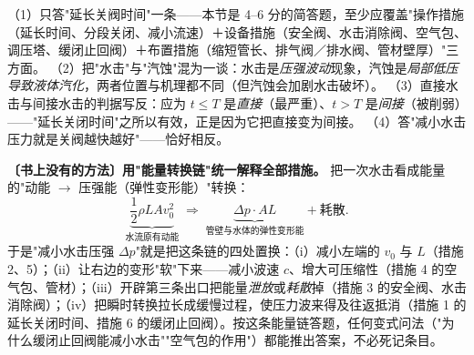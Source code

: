 \begin{yicuo}
（1）只答"延长关阀时间"一条——本节是 4--6 分的简答题，至少应覆盖"操作措施（延长时间、分段关闭、减小流速）＋设备措施（安全阀、水击消除阀、空气包、调压塔、缓闭止回阀）＋布置措施（缩短管长、排气阀／排水阀、管材壁厚）"三方面。
（2）把"水击"与"汽蚀"混为一谈：水击是\emph{压强波动}现象，汽蚀是\emph{局部低压导致液体汽化}，两者位置与机理都不同（但汽蚀会加剧水击破坏）。
（3）直接水击与间接水击的判据写反：应为 $t\le T$ 是\emph{直接}（最严重）、$t>T$ 是\emph{间接}（被削弱）——"延长关闭时间"之所以有效，正是因为它把直接变为间接。
（4）答"减小水击压力就是关阀越快越好"——恰好相反。
\end{yicuo}
\begin{banfa}
\textbf{〔书上没有的方法〕用"能量转换链"统一解释全部措施。} 把一次水击看成能量的"动能 $\to$ 压强能（弹性变形能）"转换：
\[\underbrace{\frac12\rho L A v_0^2}_{\text{水流原有动能}}\;\Longrightarrow\;\underbrace{\Delta p\cdot A L}_{\text{管壁与水体的弹性变形能}}+\text{耗散}.\]
于是"减小水击压强 $\Delta p$"就是把这条链的四处置换：（i）减小左端的 $v_0$ 与 $L$（措施 2、5）；（ii）让右边的变形"软"下来——减小波速 $c$、增大可压缩性（措施 4 的空气包、管材）；（iii）开辟第三条出口把能量\emph{泄放}或\emph{耗散}掉（措施 3 的安全阀、水击消除阀）；（iv）把瞬时转换拉长成缓慢过程，使压力波来得及往返抵消（措施 1 的延长关闭时间、措施 6 的缓闭止回阀）。按这条能量链答题，任何变式问法（"为什么缓闭止回阀能减小水击""空气包的作用"）都能推出答案，不必死记条目。
\end{banfa}
